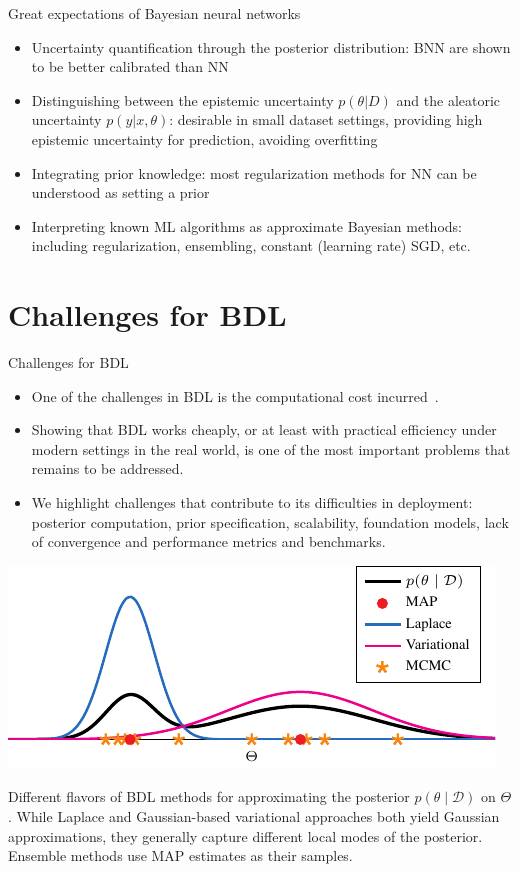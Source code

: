 \documentclass[9pt,handout]{beamer}
\begin{document}
\begin{frame}{Great expectations of Bayesian neural networks}
\begin{itemize}[<+->]
	\item Uncertainty quantification through the posterior distribution: BNN are shown to be better calibrated than NN
	\item Distinguishing between the epistemic uncertainty $p(\theta|D)$ and the aleatoric uncertainty $p(y|x,\theta)$: desirable in small dataset settings, providing high epistemic uncertainty for prediction, avoiding overfitting
	\item Integrating prior knowledge: most regularization methods for NN can be understood as setting a prior
	\item Interpreting known ML algorithms as approximate Bayesian methods: including regularization, ensembling, constant (learning rate) SGD, etc. 
\end{itemize}
\end{frame}


\section{Challenges for BDL}

\begin{frame}{Challenges for BDL}
\begin{itemize}[<+->]
	\item One of the challenges in BDL is the \alert{computational cost} incurred~\citep{izmailov2021}. 
	\item Showing that BDL works cheaply, or at least with practical efficiency under modern settings in the real world, is one of the most important problems that remains to be addressed.  %
	\item We highlight challenges that contribute to its difficulties in deployment: \alert{posterior computation}, \alert{prior specification}, \alert{scalability},  \alert{foundation models}, \alert{lack of convergence} and \alert{performance metrics and benchmarks}.
\end{itemize}
\begin{center}
	\includegraphics[width=.7\textwidth]{figures_julyan/bdl/bdl_methods}
\end{center}
    Different flavors of BDL methods for approximating the posterior \(p(\theta \mid \mathcal{D})\) on \(\Theta\).
    While Laplace and Gaussian-based variational approaches both yield Gaussian approximations, they generally capture different local modes of the posterior.
    Ensemble methods use MAP estimates as their samples.
\end{frame}
\end{document}

